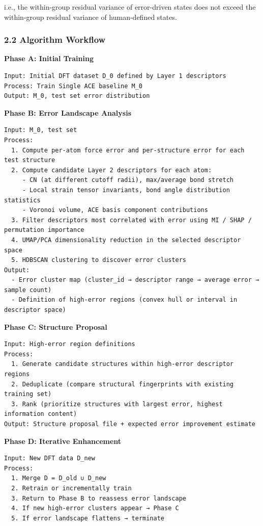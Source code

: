 \documentclass[
  12pt,
]{article}
\begin{document}
i.e., the within-group residual variance of error-driven states does not exceed the within-group residual variance of human-defined states.

\subsubsection{2.2 Algorithm Workflow}\label{algorithm-workflow}

\textbf{Phase A: Initial Training}

\begin{verbatim}
Input: Initial DFT dataset D_0 defined by Layer 1 descriptors
Process: Train Single ACE baseline M_0
Output: M_0, test set error distribution
\end{verbatim}

\textbf{Phase B: Error Landscape Analysis}

\begin{verbatim}
Input: M_0, test set
Process:
  1. Compute per-atom force error and per-structure error for each test structure
  2. Compute candidate Layer 2 descriptors for each atom:
     - CN (at different cutoff radii), max/average bond stretch
     - Local strain tensor invariants, bond angle distribution statistics
     - Voronoi volume, ACE basis component contributions
  3. Filter descriptors most correlated with error using MI / SHAP / permutation importance
  4. UMAP/PCA dimensionality reduction in the selected descriptor space
  5. HDBSCAN clustering to discover error clusters
Output:
  - Error cluster map (cluster_id → descriptor range → average error → sample count)
  - Definition of high-error regions (convex hull or interval in descriptor space)
\end{verbatim}

\textbf{Phase C: Structure Proposal}

\begin{verbatim}
Input: High-error region definitions
Process:
  1. Generate candidate structures within high-error descriptor regions
  2. Deduplicate (compare structural fingerprints with existing training set)
  3. Rank (prioritize structures with largest error, highest information content)
Output: Structure proposal file + expected error improvement estimate
\end{verbatim}

\textbf{Phase D: Iterative Enhancement}

\begin{verbatim}
Input: New DFT data D_new
Process:
  1. Merge D = D_old ∪ D_new
  2. Retrain or incrementally train
  3. Return to Phase B to reassess error landscape
  4. If new high-error clusters appear → Phase C
  5. If error landscape flattens → terminate
\end{verbatim}
\end{document}
